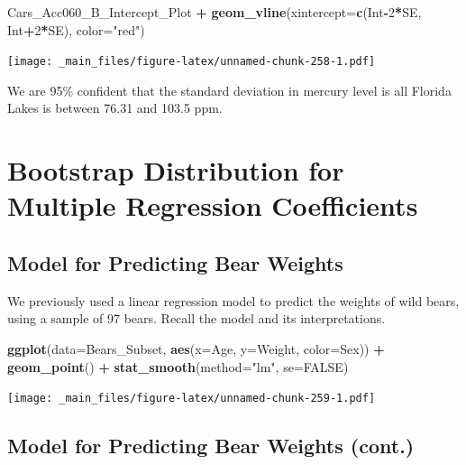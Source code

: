 \documentclass[]{book}
\newenvironment{Shaded}{\begin{snugshade}}{\end{snugshade}}
\newcommand{\KeywordTok}[1]{\textcolor[rgb]{0.13,0.29,0.53}{\textbf{#1}}}
\newcommand{\DataTypeTok}[1]{\textcolor[rgb]{0.13,0.29,0.53}{#1}}
\newcommand{\DecValTok}[1]{\textcolor[rgb]{0.00,0.00,0.81}{#1}}
\newcommand{\StringTok}[1]{\textcolor[rgb]{0.31,0.60,0.02}{#1}}
\newcommand{\OtherTok}[1]{\textcolor[rgb]{0.56,0.35,0.01}{#1}}
\newcommand{\OperatorTok}[1]{\textcolor[rgb]{0.81,0.36,0.00}{\textbf{#1}}}
\newcommand{\NormalTok}[1]{#1}
\begin{document}
\begin{Shaded}
\begin{Highlighting}[]
\NormalTok{Cars_Acc060_B_Intercept_Plot  }\OperatorTok{+}\StringTok{ }\KeywordTok{geom_vline}\NormalTok{(}\DataTypeTok{xintercept=}\KeywordTok{c}\NormalTok{(Int}\OperatorTok{-}\DecValTok{2}\OperatorTok{*}\NormalTok{SE, Int}\OperatorTok{+}\DecValTok{2}\OperatorTok{*}\NormalTok{SE), }\DataTypeTok{color=}\StringTok{"red"}\NormalTok{) }
\end{Highlighting}
\end{Shaded}

\texttt{[image: \_main\_files/figure-latex/unnamed-chunk-258-1.pdf]}

We are 95\% confident that the standard deviation in mercury level is
all Florida Lakes is between 76.31 and 103.5 ppm.

\section{Bootstrap Distribution for Multiple Regression
Coefficients}\label{bootstrap-distribution-for-multiple-regression-coefficients}

\subsection{Model for Predicting Bear
Weights}\label{model-for-predicting-bear-weights}

We previously used a linear regression model to predict the weights of
wild bears, using a sample of 97 bears. Recall the model and its
interpretations.

\begin{Shaded}
\begin{Highlighting}[]
\KeywordTok{ggplot}\NormalTok{(}\DataTypeTok{data=}\NormalTok{Bears_Subset, }\KeywordTok{aes}\NormalTok{(}\DataTypeTok{x=}\NormalTok{Age, }\DataTypeTok{y=}\NormalTok{Weight, }\DataTypeTok{color=}\NormalTok{Sex)) }\OperatorTok{+}\StringTok{ }
\StringTok{  }\KeywordTok{geom_point}\NormalTok{() }\OperatorTok{+}\StringTok{ }\KeywordTok{stat_smooth}\NormalTok{(}\DataTypeTok{method=}\StringTok{"lm"}\NormalTok{, }\DataTypeTok{se=}\OtherTok{FALSE}\NormalTok{)}
\end{Highlighting}
\end{Shaded}

\texttt{[image: \_main\_files/figure-latex/unnamed-chunk-259-1.pdf]}

\subsection{Model for Predicting Bear Weights
(cont.)}\label{model-for-predicting-bear-weights-cont.}
\end{document}
